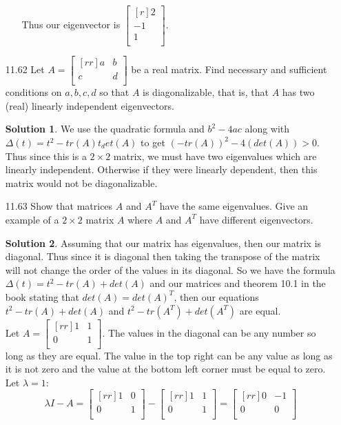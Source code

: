 \documentclass[12pt]{article}
\theoremstyle{definition}
\newtheorem*{solution}{Solution} %
\theoremstyle{plain}
\begin{document}
\begin{enumerate}
\begin{enumerate}
	Thus our eigenvector is $\begin{bmatrix}[r]2\\-1\\1\\\end{bmatrix}$.
	\end{enumerate}
\item[11.62]Let $A=\begin{bmatrix}[rr]a&b\\c&d\\\end{bmatrix}$ be a real matrix. Find necessary and sufficient conditions on $a,b,c,d$ so that $A$ is diagonalizable, that is, that $A$ has two (real) linearly independent eigenvectors.\\
	\begin{solution}
	We use the quadratic formula and $b^2-4ac$ along with $\Delta (t)=t^2-tr(A)t_det(A)$ to get $(-tr(A))^2-4(det(A)) > 0$. Thus since this is a $2\times 2$ matrix, we must have two eigenvalues which are linearly independent. Otherwise if they were linearly dependent, then this matrix would not be diagonalizable.
	\end{solution}
\item[11.63]Show that matrices $A$ and $A^T$ have the same eigenvalues. Give an example of a $2 \times 2$ matrix $A$ where $A$ and $A^T$ have different eigenvectors.\\
	\begin{solution}
	Assuming that our matrix has eigenvalues, then our matrix is diagonal. Thus since it is diagonal then taking the transpose of the matrix will not change the order of the values in its diagonal. So we have the formula $\Delta(t)=t^2-tr(A)+det(A)$ and our matrices and theorem 10.1 in the book stating that $det(A)=det(A)^T$, then our equations $t^2-tr(A)+det(A)$ and $t^2-tr(A^T)+det(A^T)$ are equal.\\
	Let $A=\begin{bmatrix}[rr]1&1\\0&1\\\end{bmatrix}$. The values in the diagonal can be any number so long as they are equal. The value in the top right can be any value as long as it is not zero and the value at the bottom left corner must be equal to zero.\\
	Let $\lambda=1$:
	\[ \lambda I-A = \begin{bmatrix}[rr]1&0\\0&1\\\end{bmatrix}-\begin{bmatrix}[rr]1&1\\0&1\\\end{bmatrix} = \begin{bmatrix}[rr]0&-1\\0&0\\\end{bmatrix} \]

\end{solution}
\end{enumerate}
\end{document}
